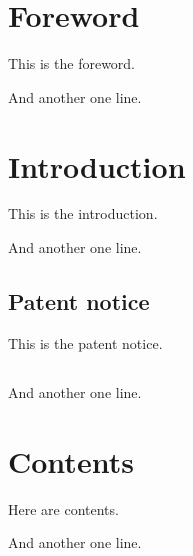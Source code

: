 \documentclass{IsoStandardDocument}
\begin{document}
  \section*{Foreword}

  This is the foreword.

  And another one line.

  \section*{Introduction}

  This is the introduction.

  And another one line.

  \subsection*{Patent notice}

  This is the patent notice.

  \subsection*{}

  And another one line.

  \section{Contents}

  Here are contents.

  And another one line.
\end{document}
